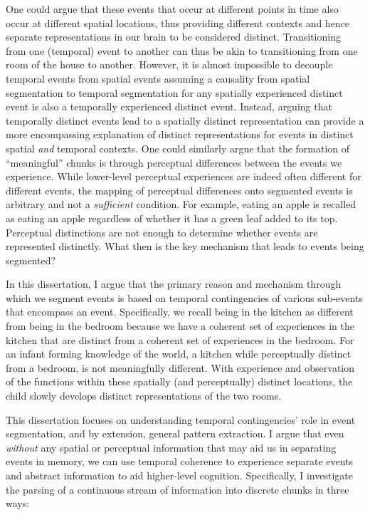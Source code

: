 One could argue that these events that occur at different points in time also occur at different spatial locations, thus providing different contexts and hence separate representations in our brain to be considered distinct. Transitioning from one (temporal) event to another can thus be akin to transitioning from one room of the house to another. However, it is almost impossible to decouple temporal events from spatial events assuming a causality from spatial segmentation to temporal segmentation for any spatially experienced distinct event is also a temporally experienced distinct event. Instead, arguing that temporally distinct events lead to a spatially distinct representation can provide a more encompassing explanation of distinct representations for events in distinct spatial \emph{and} temporal contexts. One could similarly argue that the formation of ``meaningful'' chunks is through perceptual differences between the events we experience. While lower-level perceptual experiences are indeed often different for different events, the mapping of perceptual differences onto segmented events is arbitrary and not a \emph{sufficient} condition. For example, eating an apple is recalled as eating an apple regardless of whether it has a green leaf added to its top. Perceptual distinctions are not enough to determine whether events are represented distinctly. What then is the key mechanism that leads to events being segmented? 

In this dissertation, I argue that the primary reason and mechanism through which we segment events is based on temporal contingencies of various sub-events that encompass an event. Specifically, we recall being in the kitchen as different from being in the bedroom because we have a coherent set of experiences in the kitchen that are distinct from a coherent set of experiences in the bedroom. For an infant forming knowledge of the world, a kitchen while perceptually distinct from a bedroom, is not meaningfully different. With experience and observation of the functions within these spatially (and perceptually) distinct locations, the child slowly develops distinct representations of the two rooms.

This dissertation focuses on understanding temporal contingencies' role in event segmentation, and by extension, general pattern extraction. I argue that even \emph{without} any spatial or perceptual information that may aid us in separating events in memory, we can use temporal coherence to experience separate events and abstract information to aid higher-level cognition. Specifically, I investigate the parsing of a continuous stream of information into discrete chunks in three ways:



